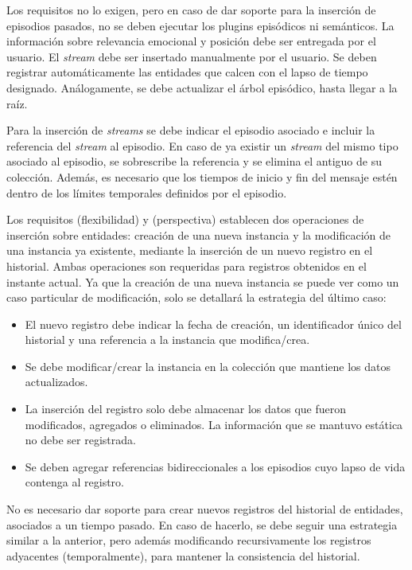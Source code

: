 Los requisitos no lo exigen, pero en caso de dar soporte para la inserción de episodios pasados, no se deben ejecutar los plugins episódicos ni semánticos. La información sobre relevancia emocional y posición debe ser entregada por el usuario. El \textit{stream} debe ser insertado manualmente por el usuario. Se deben registrar automáticamente las entidades que calcen con el lapso de tiempo designado. Análogamente, se debe actualizar el árbol episódico, hasta llegar a la raíz.

Para la inserción de \textit{streams} se debe indicar el episodio asociado e incluir la referencia del \textit{stream} al episodio. En caso de ya existir un \textit{stream} del mismo tipo asociado al episodio, se sobrescribe la referencia y se elimina el antiguo de su colección. Además, es necesario que los tiempos de inicio y fin del mensaje estén dentro de los límites temporales definidos por el episodio.

Los requisitos  (flexibilidad) y  (perspectiva) establecen dos operaciones de inserción sobre entidades: creación de una nueva instancia y la modificación de una instancia ya existente, mediante la inserción de un nuevo registro en el historial. Ambas operaciones son requeridas para registros obtenidos en el instante actual. Ya que la creación de una nueva instancia se puede ver como un caso particular de modificación, solo se detallará la estrategia del último caso:
\begin{itemize}
\item El nuevo registro debe indicar la fecha de creación, un identificador único del historial y una referencia a la instancia que modifica/crea.
\item Se debe modificar/crear la instancia en la colección que mantiene los datos actualizados.
\item La inserción del registro solo debe almacenar los datos que fueron modificados, agregados o eliminados. La información que se mantuvo estática no debe ser registrada.
\item Se deben agregar referencias bidireccionales a los episodios cuyo lapso de vida contenga al registro.
\end{itemize}

No es necesario dar soporte para crear nuevos registros del historial de entidades, asociados a un tiempo pasado. En caso de hacerlo, se debe seguir una estrategia similar a la anterior, pero además modificando recursivamente los registros adyacentes (temporalmente), para mantener la consistencia del historial.

